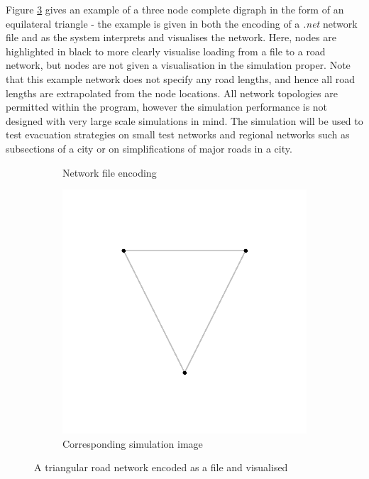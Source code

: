 Figure \ref{fig:example_network} gives an example of a three node complete digraph in the form of an equilateral triangle - the example is given in both the encoding of a \textit{.net} network file and as the system interprets and visualises the network. Here, nodes are highlighted in black to more clearly visualise loading from a file to a road network, but nodes are not given a visualisation in the simulation proper. Note that this example network does not specify any road lengths, and hence all road lengths are extrapolated from the node locations. All network topologies are permitted within the program, however the simulation performance is not designed with very large scale simulations in mind. The simulation will be used to test evacuation strategies on small test networks and regional networks such as subsections of a city or on simplifications of major roads in a city.

\begin{figure}
    \centering
    \begin{subfigure}[b]{0.3\textwidth}
        \centering
         \small{}
         \caption{Network file encoding}
         \label{fig:example_network_file}
    \end{subfigure}
    \begin{subfigure}[b]{0.5\textwidth}
        \centering
         \includegraphics[width=\textwidth]{images/ExampleNetwork.png}
         \caption{Corresponding simulation image}
         \label{fig:example_network_vis}
    \end{subfigure}
    \caption{A triangular road network encoded as a file and visualised}
    \label{fig:example_network}
\end{figure}

